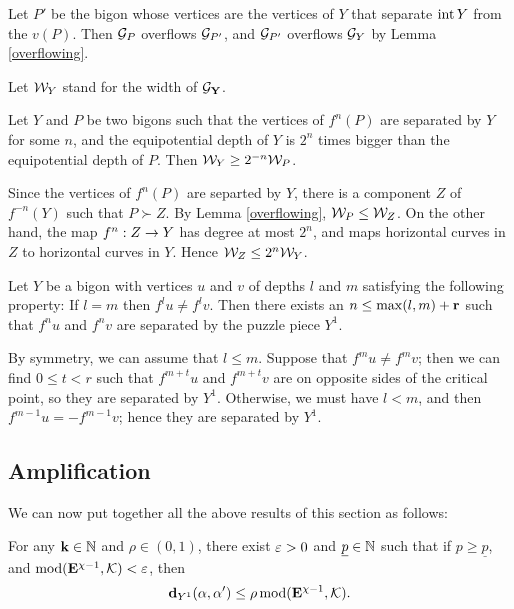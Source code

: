 \begin{pf}
  Let $P'$ be the bigon whose vertices are the vertices of $Y$ that separate $\operatorname{int} Y$
  from the $v(P)$.
  Then ${\mathcal G}_{P}$ overflows ${\mathcal G}_{P'}$,
  and ${\mathcal G}_{P'}$ overflows ${\mathcal G}_Y$ by Lemma \ref{overflowing}.
\end{pf}

Let ${\mathcal W}_Y$ stand for the width of ${\mathcal G}_{\mathbf{Y}}$. 

\begin{lem}\label{WW-est}
  Let $Y$ and $P$ be two bigons such that the vertices of $f^n(P)$  are separated by $Y$ for some $n$,
and the equipotential depth of $Y$ is $2^n$ times bigger than the equipotential depth of $P$.
Then ${\mathcal W}_Y \geq 2^{-n} {\mathcal W}_P$.  
\end{lem}

\begin{pf}
  Since the vertices of $f^n(P)$ are separted by $Y$, 
there is a component $Z$ of $f^{-n}(Y)$
such that $P\succ Z$. 
By Lemma \ref{overflowing}, ${\mathcal W}_P\leq {\mathcal W}_Z$.   
On the other hand, the map $f^n: Z\rightarrow Y$ has degree at most $2^n$,
and maps horizontal curves in $Z$ to horizontal curves in $Y$.     
Hence ${\mathcal W}_Z\leq 2^n {\mathcal W}_Y$. 
\end{pf}

\begin{lem}\label{comb separation of vertices}
   Let $Y$ be a bigon with vertices $u$ and $v$ of depths $l$ and $m$ 
satisfying the following property:
If $l=m$ then $f^l u\not=f^l v$. Then there exists an $n\leq \max(l,m)+{\mathbf{r}}$ such that
$f^n u$ and $f^n v$ are separated by the puzzle piece $Y^1$. 
\end{lem}
 
\begin{pf}
  By symmetry, we can assume that $l \le m$. 
  Suppose that $f^m u \neq f^m v$;
  then we can find $0 \le t < r$ such that 
  $f^{m+t} u$ and $f^{m+t} v$ are on opposite sides of the critical point,
  so they are separated by $Y^1$.
  Otherwise, 
  we must have $l < m$,
  and then $f^{m-1} u = - f^{m-1} v$;
  hence they are separated by $Y^1$.
\end{pf}

\subsection{Amplification}
We can now put together all the above results of this section as follows:

\begin{lem}\label{amplification}
 For any ${\mathbf{k}}\in {\mathbb N}$ and $\rho\in (0,1)$, there exist ${\varepsilon}>0$ and $\underline p\in {\mathbb N}$
such that if  $p\geq \underline{p}$, 
and $\operatorname{mod}({\mathbf{E}}^{\chi-1}, {\mathcal K})<{\varepsilon}$, then
$$
     {\mathbf{d}}_{Y^1}(\alpha, \alpha') \leq \rho \operatorname{mod}({\mathbf{E}}^{\chi-1}, {\mathcal K}) . 
$$   
\end{lem}

